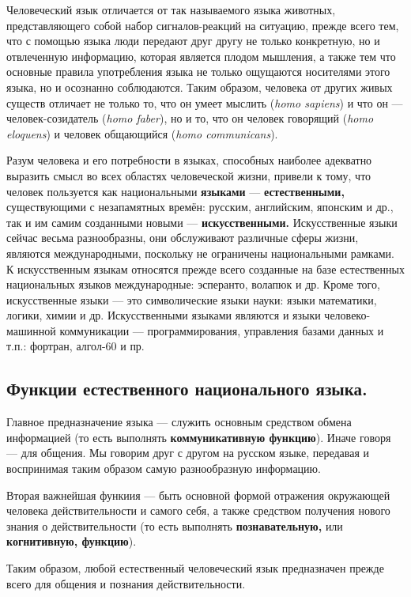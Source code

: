 Человеческий язык отличается от так называемого языка животных, представляющего собой набор сигналов-реакций на ситуацию, прежде всего тем, что с помощью языка люди передают друг другу не только конкретную, но и отвлеченную информацию, которая является плодом мышления, а также тем что основные правила употребления языка не только ощущаются носителями этого языка, но и осознанно соблюдаются.
Таким образом, человека от других живых существ отличает не только то, что он умеет мыслить (\textit{homo sapiens}) и что он --- человек-созидатель (\textit{homo faber}), но и то, что он человек говорящий (\textit{homo eloquens}) и человек общающийся (\textit{homo communicans}).

Разум человека и его потребности в языках, способных наиболее адекватно выразить смысл во всех областях человеческой жизни, привели к тому, что человек пользуется как национальными \textbf{языками} --- \textbf{естественными,} существующими с незапамятных времён: русским, английским, японским и др., так и им самим созданными новыми --- \textbf{искусственными.}
Искусственные языки сейчас весьма разнообразны, они обслуживают различные сферы жизни, являются международными, поскольку не ограничены национальными рамками.
К искусственным языкам относятся прежде всего созданные на базе естественных национальных языков международные: эсперанто, волапюк и др.
Кроме того, искусственные языки --- это символические языки науки: языки математики, логики, химии и др.
Искусственными языками являются и языки человеко-машинной коммуникации --- программирования, управления базами данных и т.п.: фортран, алгол-60 и пр.

\subsection*{Функции естественного национального языка.}

Главное предназначение языка --- служить основным средством обмена информацией (то есть выполнять \textbf{коммуникативную функцию}).
Иначе говоря --- для общения.
Мы говорим друг с другом на русском языке, передавая и воспринимая таким образом самую разнообразную информацию.

Вторая важнейшая функиия --- быть основной формой отражения окружающей человека действительности и самого себя, а также средством получения нового знания о действительности (то есть выполнять \textbf{познавательную,} или \textbf{когнитивную, функцию}).

Таким образом, любой естественный человеческий язык предназначен прежде всего для общения и познания действительности.

